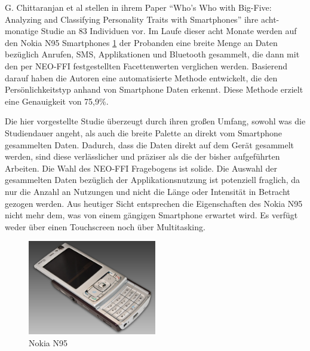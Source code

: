 G. Chittaranjan et al stellen in ihrem Paper "`Who’s Who with Big-Five: Analyzing and Classifying Personality Traits with Smartphones"' ihre acht-monatige Studie an 83 Individuen vor.
Im Laufe dieser acht Monate werden auf den Nokia N95 Smartphones \ref{nokia} der Probanden eine breite Menge an Daten bezüglich Anrufen, SMS, Applikationen und Bluetooth gesammelt, 
die dann mit den per NEO-FFI festgestellten Facettenwerten verglichen werden.
Basierend darauf haben die Autoren eine automatisierte Methode entwickelt, die den Persönlichkeitstyp anhand von Smartphone Daten erkennt.
Diese Methode erzielt eine Genauigkeit von 75,9\%.
\par
Die hier vorgestellte Studie überzeugt durch ihren großen Umfang, sowohl was die Studiendauer angeht, als auch die breite Palette an direkt vom Smartphone gesammelten Daten.
Dadurch, dass die Daten direkt auf dem Gerät gesammelt werden, sind diese verlässlicher und präziser als die der bisher aufgeführten Arbeiten.
Die Wahl des NEO-FFI Fragebogens ist solide.
Die Auswahl der gesammelten Daten bezüglich der Applikationsnutzung ist potenziell fraglich, da nur die Anzahl an Nutzungen und nicht die Länge oder Intensität in Betracht gezogen werden.
Aus heutiger Sicht entsprechen die Eigenschaften des Nokia N95 nicht mehr dem, was von einem gängigen Smartphone erwartet wird.
Es verfügt weder über einen Touchscreen noch über Multitasking.

\begin{figure}[h]
    \centering
    \includegraphics[width=0.5\textwidth]{images/N95_Front-slide-open}
    \caption{Nokia N95\cite{nokiaPhone}}
    \label{nokia}
\end{figure}



